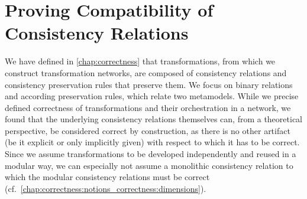 \chapter{Proving Compatibility of Consistency Relations
}
\label{chap:compatibility}


We have defined in \autoref{chap:correctness} that transformations, from which we construct transformation networks, are composed of consistency relations and consistency preservation rules that preserve them.
We focus on binary relations and according preservation rules, which relate two metamodels.
While we precise defined correctness of transformations and their orchestration in a network, we
found that the underlying consistency relations themselves can, from a theoretical perspective, be considered correct by construction, as there is no other artifact (be it explicit or only implicitly given) with respect to which it has to be correct.
Since we assume transformations to be developed independently and reused in a modular way, we can especially not assume a monolithic consistency relation to which the modular consistency relations must be correct (cf.\ \autoref{chap:correctness:notions_correctness:dimensions}).

